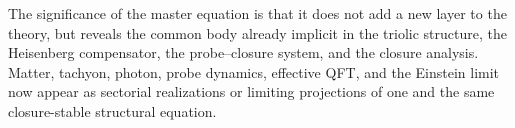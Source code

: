 The significance of the master equation is that it does not add a new layer to
the theory, but reveals the common body already implicit in the triolic
structure, the Heisenberg compensator, the probe--closure system, and the
closure analysis. Matter, tachyon, photon, probe dynamics, effective QFT, and
the Einstein limit now appear as sectorial realizations or limiting
projections of one and the same closure-stable structural equation.

